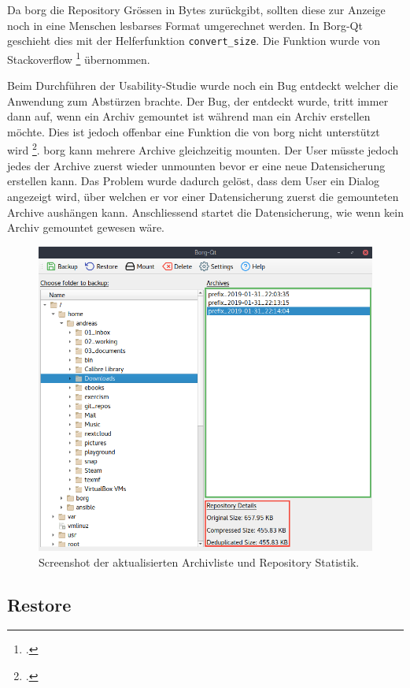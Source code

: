 Da \gls{borg} die Repository Grössen in Bytes zurückgibt, sollten diese zur
Anzeige noch in eine Menschen lesbarses Format umgerechnet werden. In Borg-Qt
geschieht dies mit der Helferfunktion \texttt{convert\_size}. Die Funktion wurde von
Stackoverflow \footcite{sizeformat} übernommen.

Beim Durchführen der Usability-Studie wurde noch ein Bug entdeckt welcher die
Anwendung zum Abstürzen brachte. Der Bug, der entdeckt wurde, tritt immer dann
auf, wenn ein Archiv gemountet ist während man ein Archiv erstellen möchte.
Dies ist jedoch offenbar eine Funktion die von \gls{borg} nicht unterstützt wird
\footcite{borgmountissue}. \gls{borg} kann mehrere Archive gleichzeitig mounten.
Der User müsste jedoch jedes der Archive zuerst wieder unmounten bevor er eine
neue Datensicherung erstellen kann. Das Problem wurde dadurch gelöst, dass dem
User ein Dialog angezeigt wird, über welchen er vor einer Datensicherung zuerst
die gemounteten Archive aushängen kann. Anschliessend startet die
Datensicherung, wie wenn kein Archiv gemountet gewesen wäre.

\begin{figure}[htbp]
\centering
\includegraphics[width=.9\linewidth]{pictures/borgqt_archive_list.png}
\caption{\label{fig:org24ed7cf}
Screenshot der aktualisierten Archivliste und Repository Statistik.}
\end{figure}

\subsection{Restore}
\label{sec:org5c152c9}

